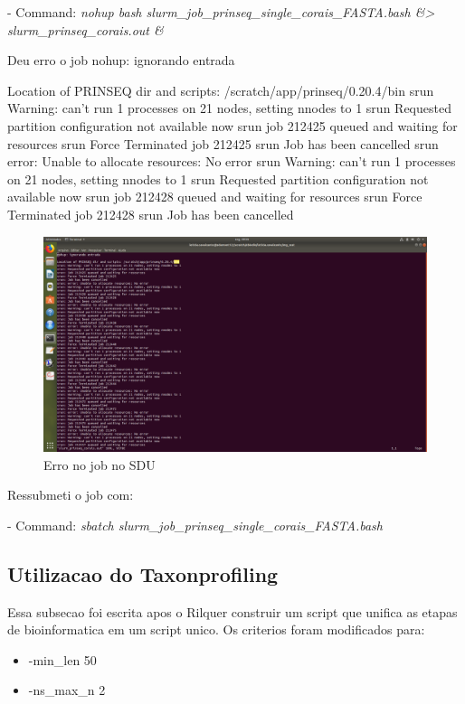 \documentclass[12pt, a4paper]{report}
\begin{document}
\begin{tcolorbox}[width=6.3in]
 - Command: \textit{nohup bash slurm\_job\_prinseq\_single\_corais\_FASTA.bash \&> slurm\_prinseq\_corais.out \&}
 \end{tcolorbox}

Deu erro o job\:
nohup: ignorando entrada

\begin{tcolorbox}[width=6.3in]
 \scriptsize 
Location of PRINSEQ dir and scripts: /scratch/app/prinseq/0.20.4/bin
srun\: Warning: can't run 1 processes on 21 nodes, setting nnodes to 1
srun\: Requested partition configuration not available now
srun\: job 212425 queued and waiting for resources
srun\: Force Terminated job 212425
srun\: Job has been cancelled
srun\: error: Unable to allocate resources: No error
srun\: Warning: can't run 1 processes on 21 nodes, setting nnodes to 1
srun\: Requested partition configuration not available now
srun\: job 212428 queued and waiting for resources
srun\: Force Terminated job 212428
srun\: Job has been cancelled
\end{tcolorbox}


 \begin{figure}[H]
  \centering 
  \includegraphics[width=1.0\textwidth]{figures/Captura-2018-09-10 09-35-27.png}
  \caption{Erro no job no SDU}
 \end{figure}

Ressubmeti o job com:

\begin{tcolorbox}[width=6.3in]
- Command: \textit{sbatch slurm\_job\_prinseq\_single\_corais\_FASTA.bash}
\end{tcolorbox}

\subsection{Utilizacao do Taxonprofiling}
Essa subsecao foi escrita apos o Rilquer construir um script que unifica as etapas de bioinformatica em um script unico.
Os criterios foram modificados para:
\begin{itemize}
\item -min\_len 50
\item -ns\_max\_n 2
\end{itemize}
\end{document}

